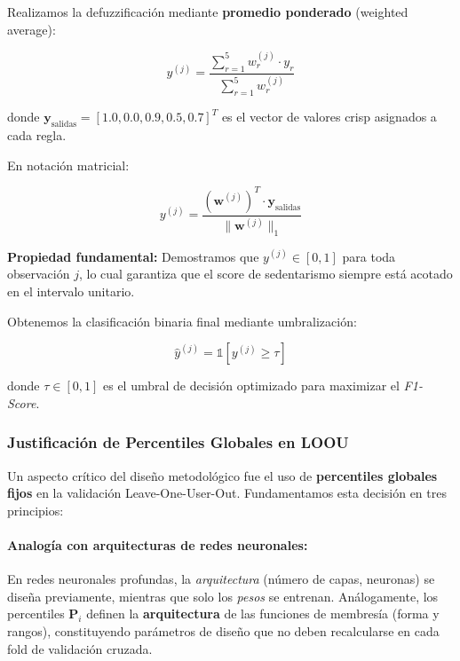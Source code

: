 Realizamos la defuzzificación mediante \textbf{promedio ponderado} (weighted average):

\begin{equation}
y^{(j)} = \frac{\sum_{r=1}^{5} w_r^{(j)} \cdot y_r}{\sum_{r=1}^{5} w_r^{(j)}}
\label{eq:defuzzificacion}
\end{equation}

donde \(\mathbf{y}_{\text{salidas}} = [1.0, 0.0, 0.9, 0.5, 0.7]^T\) es el vector de valores crisp asignados a cada regla.

En notación matricial:

\begin{equation}
y^{(j)} = \frac{(\mathbf{w}^{(j)})^T \cdot \mathbf{y}_{\text{salidas}}}{\|\mathbf{w}^{(j)}\|_1}
\label{eq:defuzz_matricial}
\end{equation}

\textbf{Propiedad fundamental:} Demostramos que \(y^{(j)} \in [0, 1]\) para toda observación \(j\), lo cual garantiza que el score de sedentarismo siempre está acotado en el intervalo unitario.

Obtenemos la clasificación binaria final mediante umbralización:

\begin{equation}
\hat{y}^{(j)} = \mathbb{1}[y^{(j)} \geq \tau]
\label{eq:binarizacion}
\end{equation}

donde \(\tau \in [0, 1]\) es el umbral de decisión optimizado para maximizar el \textit{F1-Score}.

\subsubsection{Justificación de Percentiles Globales en LOOU}
\label{subsubsec:percentiles_globales}

Un aspecto crítico del diseño metodológico fue el uso de \textbf{percentiles globales fijos} en la validación Leave-One-User-Out. Fundamentamos esta decisión en tres principios:

\paragraph{Analogía con arquitecturas de redes neuronales:}
En redes neuronales profundas, la \textit{arquitectura} (número de capas, neuronas) se diseña previamente, mientras que solo los \textit{pesos} se entrenan. Análogamente, los percentiles \(\mathbf{P}_i\) definen la \textbf{arquitectura} de las funciones de membresía (forma y rangos), constituyendo parámetros de diseño que no deben recalcularse en cada fold de validación cruzada.

